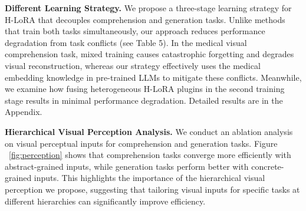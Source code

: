 \noindent \textbf{Different Learning Strategy.} 
We propose a three-stage learning strategy for H-LoRA that decouples comprehension and generation tasks. Unlike methods that train both tasks simultaneously, our approach reduces performance degradation from task conflicts (see Table 5). In the medical visual comprehension task, mixed training causes catastrophic forgetting and degrades visual reconstruction, whereas our strategy effectively uses the medical embedding knowledge in pre-trained LLMs to mitigate these conflicts. 
Meanwhile, we examine how fusing heterogeneous H-LoRA plugins in the second training stage results in minimal performance degradation. Detailed results are in the Appendix.



\noindent \textbf{Hierarchical Visual Perception Analysis.} We conduct an ablation analysis on visual perceptual inputs for comprehension and generation tasks. Figure ~\ref{fig:perception} shows that comprehension tasks converge more efficiently with abstract-grained inputs, while generation tasks perform better with concrete-grained inputs. This highlights the importance of the hierarchical visual perception we propose, suggesting that tailoring visual inputs for specific tasks at different hierarchies can significantly improve efficiency.



